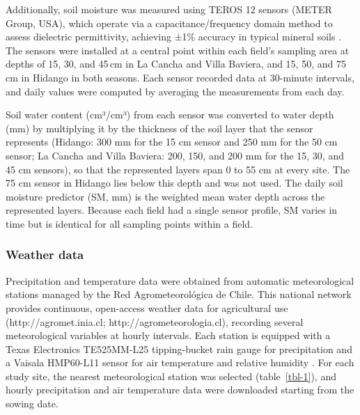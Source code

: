 \documentclass[
  british,
]{interact}
\begin{document}
Additionally, soil moisture was measured using TEROS 12 sensors (METER
Group, USA), which operate via a capacitance/frequency domain method to
assess dielectric permittivity, achieving ±1\% accuracy in typical
mineral soils \citep{Fragkos2024}. The sensors were installed at a
central point within each field's sampling area at depths of 15, 30, and
45\,cm in La Cancha and Villa Baviera, and 15, 50, and 75\,cm in Hidango
in both seasons. Each sensor recorded data at 30-minute intervals, and
daily values were computed by averaging the measurements from each day.

Soil water content (cm³/cm³) from each sensor was converted to water
depth (mm) by multiplying it by the thickness of the soil layer that the
sensor represents (Hidango: 300 mm for the 15 cm sensor and 250 mm for
the 50 cm sensor; La Cancha and Villa Baviera: 200, 150, and 200 mm for
the 15, 30, and 45 cm sensors), so that the represented layers span 0 to
55 cm at every site. The 75 cm sensor in Hidango lies below this depth
and was not used. The daily soil moisture predictor (SM, mm) is the
weighted mean water depth across the represented layers. Because each
field had a single sensor profile, SM varies in time but is identical
for all sampling points within a field.

\subsubsection{Weather data}\label{weather-data}

Precipitation and temperature data were obtained from automatic
meteorological stations managed by the Red Agrometeorológica de Chile.
This national network provides continuous, open-access weather data for
agricultural use (http://agromet.inia.cl; http://agrometeorologia.cl),
recording several meteorological variables at hourly intervals. Each
station is equipped with a Texas Electronics TE525MM-L25 tipping-bucket
rain gauge for precipitation and a Vaisala HMP60-L11 sensor for air
temperature and relative humidity \citep{ChaconC2019}. For each study
site, the nearest meteorological station was selected
(table~\ref{tbl-1}), and hourly precipitation and air temperature data
were downloaded starting from the sowing date.
\end{document}
